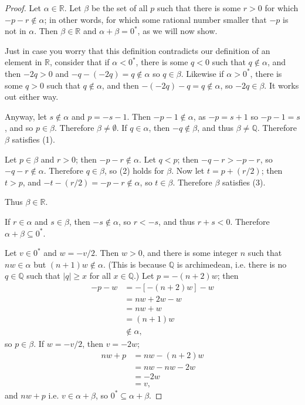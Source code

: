 \documentclass[12pt]{article}
\begin{document}
\begin{thm}
\begin{proof}
    Let $\alpha \in \mathbb{R}$. Let $\beta$ be the set of all $p$ such that there is
    some $r > 0$ for which $-p - r \notin \alpha$; in other words, for which some
    rational number smaller that $-p$ is not in $\alpha$. Then $\beta \in \mathbb{R}$
    and $\alpha + \beta = 0^*$, as we will now show.

    Just in case you worry that this definition contradicts our definition of an
    element in $\mathbb{R}$, consider that if $\alpha < 0^*$, there is some $q < 0$
    such that $q \notin \alpha$, and then $-2q > 0$ and $-q - (-2q) = q \notin
    \alpha$ so $q \in \beta$. Likewise if $\alpha > 0^*$, there is some $q > 0$ such
    that $q \notin \alpha$, and then $-(-2q) - q = q \notin \alpha$, so $-2q \in
    \beta$. It works out either way.

    Anyway, let $s \notin \alpha$ and $p = -s - 1$. Then $-p -1 \notin \alpha$, as
    $-p = s + 1$ so $-p - 1 = s$, and so $p \in \beta$. Therefore $\beta \neq
    \emptyset$. If $q \in \alpha$, then $-q \notin \beta$, and thus $\beta \neq
    \mathbb{Q}$. Therefore $\beta$ satisfies (1).

    Let $p \in \beta$ and $r > 0$; then $-p -r \notin \alpha$. Let $q < p$; then $-q
    - r > -p - r$, so $-q - r \notin \alpha$. Therefore $q \in \beta$, so (2) holds
    for $\beta$. Now let $t = p + (r/2)$; then $t > p$, and $-t - (r/2) = -p - r
    \notin \alpha$, so $t \in \beta$. Therefore $\beta$ satisfies (3).

    Thus $\beta \in \mathbb{R}$.

    If $r \in \alpha$ and $s \in \beta$, then $-s \notin \alpha$, so $r < -s$, and
    thus $r + s < 0$. Therefore $\alpha + \beta \subseteq 0^*$.

    Let $v \in 0^*$ and $w = -v/2$. Then $w > 0$, and there is some integer $n$ such
    that $nw \in \alpha$ but $(n + 1)w \notin \alpha$. (This is because $\mathbb{Q}$
    is archimedean, i.e. there is no $q \in \mathbb{Q}$ such that $|q| \geq x$ for
    all $x \in \mathbb{Q}$.) Let $p = -(n + 2)w$; then
    \begin{align*}
      -p - w &= -[-(n + 2)w] - w\\
      &= nw + 2w - w\\
      &= nw + w\\
      &= (n + 1)w\\
      &\notin \alpha,
    \end{align*}
    so $p \in \beta$. If $w = -v/2$, then $v = -2w$;
    \begin{align*}
      nw + p &= nw - (n + 2)w\\
      &= nw - nw - 2w\\
      &= -2w\\
      &= v,
    \end{align*}
    and $nw + p$ i.e.  $v \in \alpha + \beta$, so $0^* \subseteq \alpha + \beta$.


\end{proof}
\end{thm}
\end{document}
